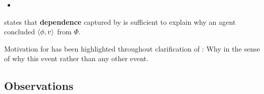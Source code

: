 \begin{note}
  \begin{link}
    \label{link:why:support:pvpp}
    \begin{itemize}
    \item
    \end{itemize}
    \vspace{-\baselineskip}
  \end{link}

  \linkW{} states that \textbf{dependence} captured by \qWhyV{} is sufficient to explain why an agent concluded \(\langle \phi, v \rangle\) from \(\Phi\).
\end{note}

\begin{note}
  Motivation for \linkW{} has been highlighted throughout clarification of \qWhyV{}:
  Why in the sense of why this event rather than any other event.
\end{note}

\subsection{Observations}

